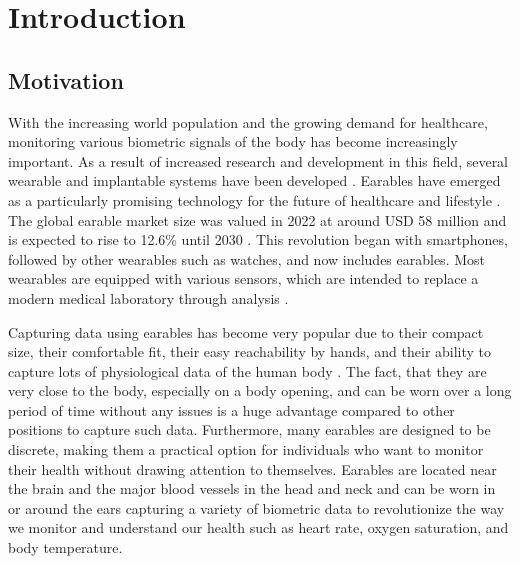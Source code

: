 
\chapter{Introduction}
\label{ch:Introduction}

\section{Motivation}
With the increasing world population and the growing demand for healthcare, monitoring various biometric signals of the body has become increasingly important. 
As a result of increased research and development in this field, several wearable and implantable systems have been developed \cite{loncar-turukaloLiteratureWearableTechnology2019}.
Earables have emerged as a particularly promising technology for the future of healthcare and lifestyle \cite{trespGoingDigitalSurvey2016, kirkWearablesRevolutionStandardization2014a}. 
The global earable market size was valued in 2022 at around USD 58 million and is expected to rise to 12.6\% until 2030 \cite{GlobalEarphonesHeadphones}.
This revolution began with smartphones, followed by other wearables such as watches, and now includes earables. 
Most wearables are equipped with various sensors, which are intended to replace a modern medical laboratory through analysis \cite{loncar-turukaloLiteratureWearableTechnology2019}.

Capturing data using earables has become very popular due to their compact size, their comfortable fit, their easy reachability by hands, and their ability to capture lots of physiological data of the human body \cite{roddigerSensingEarablesSystematic2022a}. 
The fact, that they are very close to the body, especially on a body opening, and can be worn over a long period of time without any issues is a huge advantage compared to other positions to capture such data.
Furthermore, many earables are designed to be discrete, making them a practical option for individuals who want to monitor their health without drawing attention to themselves.
Earables are located near the brain and the major blood vessels in the head and neck and can be worn in or around the ears capturing a variety of biometric data to revolutionize the way we monitor and understand our health such as heart rate, oxygen saturation, and body temperature.

